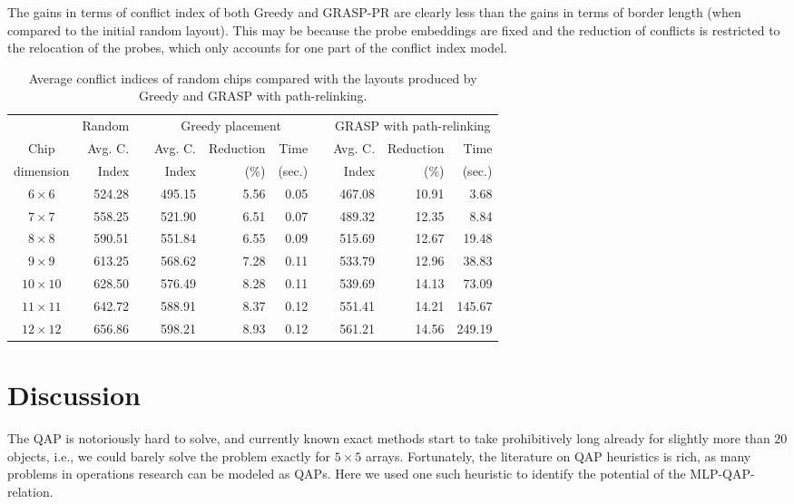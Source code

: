 The gains in terms of conflict index of both Greedy and GRASP-PR are clearly
less than the gains in terms of border length (when compared to the initial
random layout). This may be because the probe embeddings are fixed and the
reduction of conflicts is restricted to the relocation of the probes, which only
accounts for one part of the conflict index model.

\begin{table}[t]\centering
\caption{\label{tab:graspr_greedy_ci}
  Average conflict indices of random chips compared with the layouts produced by
  Greedy and GRASP with path-relinking.}
\footnotesize{
\begin{tabular}{crcrrrcrrr}
          & Random & & \multicolumn{3}{c}{Greedy placement}  & & \multicolumn{3}{c}{GRASP with path-relinking}  \\ \cline{2-2} \cline{4-6} \cline{8-10}
Chip      & Avg. C.& & Avg. C.& Reduction & Time             & & Avg. C.& Reduction & Time   \\
dimension & Index  & & Index  & (\%)      & (sec.)           & & Index  & (\%)      & (sec.) \\
\hline
$6\times 6$   & 524.28 & & 495.15 & 5.56 & 0.05 & & 467.08 & 10.91 &   3.68 \\
$7\times 7$   & 558.25 & & 521.90 & 6.51 & 0.07 & & 489.32 & 12.35 &   8.84 \\
$8\times 8$   & 590.51 & & 551.84 & 6.55 & 0.09 & & 515.69 & 12.67 &  19.48 \\
$9\times 9$   & 613.25 & & 568.62 & 7.28 & 0.11 & & 533.79 & 12.96 &  38.83 \\
$10\times 10$ & 628.50 & & 576.49 & 8.28 & 0.11 & & 539.69 & 14.13 &  73.09 \\
$11\times 11$ & 642.72 & & 588.91 & 8.37 & 0.12 & & 551.41 & 14.21 & 145.67 \\
$12\times 12$ & 656.86 & & 598.21 & 8.93 & 0.12 & & 561.21 & 14.56 & 249.19 \\
\hline
\end{tabular}}
\end{table}

\section{Discussion}
\label{sec:qap_discussion}

The QAP is notoriously hard to solve, and currently known exact methods start to
take prohibitively long already for slightly more than $20$ objects, i.e., we
could barely solve the problem exactly for $5\times 5$ arrays. Fortunately, the
literature on QAP heuristics is rich, as many problems in operations research
can be modeled as QAPs. Here we used one such heuristic to identify the
potential of the MLP-QAP-relation.

